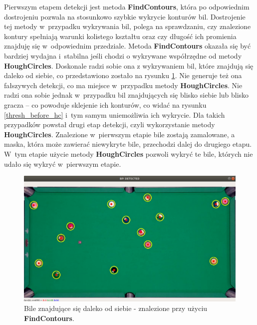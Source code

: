 \documentclass[12pt]{article}
\begin{document}
    Pierwszym etapem detekcji jest metoda \textbf{FindContours}, która po odpowiednim dostrojeniu pozwala na stosunkowo szybkie wykrycie konturów bil. Dostrojenie tej metody w~przypadku wykrywania bil, polega na sprawdzaniu, czy znalezione kontury spełniają warunki kolistego kształtu oraz czy długość ich promienia znajduję się w~odpowiednim przedziale. Metoda \textbf{FindContours} okazała się być bardziej wydajna i~stabilna jeśli chodzi o wykrywane współrzędne od metody \textbf{HoughCircles}. Doskonale radzi sobie ona z wykrywaniem bil, które znajdują się daleko od siebie, co przedstawiono zostało na rysunku \ref{bp_detected}. Nie generuje też ona fałszywych detekcji, co ma miejsce w~przypadku metody \textbf{HoughCircles}. Nie radzi ona sobie jednak w~przypadku bil znajdujących się blisko siebie lub blisko gracza – co powoduje sklejenie ich konturów, co widać na rysunku \ref{thresh_before_hc} i~tym samym uniemożliwia ich wykrycie. Dla takich przypadków powstał drugi etap detekcji, czyli wykorzystanie metody \textbf{HoughCircles}. Znalezione w~pierwszym etapie bile zostają zamalowane, a maska, która może zawierać niewykryte bile, przechodzi dalej do drugiego etapu. W~tym etapie użycie metody \textbf {HoughCircles} pozwoli wykryć te bile, których nie udało się wykryć w~pierwszym etapie.

    \begin{figure}[!htb]
        \centering
        \includegraphics[width=15cm]{./images/obrazki/bp/bp_detected.png}
        \caption{Bile znajdujące się daleko od siebie - znalezione przy użyciu \textbf{FindContours}.}
        \label{bp_detected}
    \end{figure}
\end{document}
